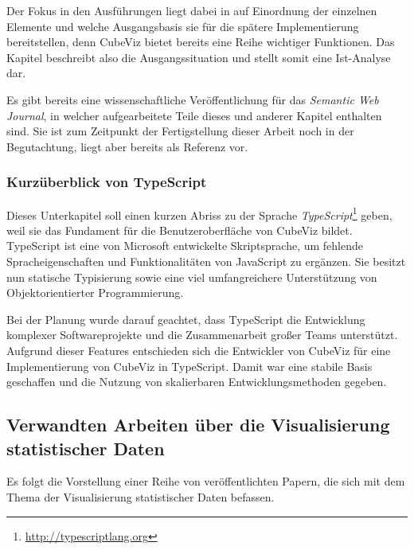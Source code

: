 \documentclass[11pt]{article}
\begin{document}
\noindent
Der Fokus in den Ausführungen liegt dabei in auf Einordnung der einzelnen Elemente und welche Ausgangsbasis sie für die spätere Implementierung bereitstellen, denn CubeViz bietet bereits eine Reihe wichtiger Funktionen. Das Kapitel beschreibt also die Ausgangssituation und stellt somit eine Ist-Analyse dar.

\noindent
Es gibt bereits eine wissenschaftliche Veröffentlichung für das \textit{Semantic Web Journal}, in welcher aufgearbeitete Teile dieses und anderer Kapitel enthalten sind. Sie ist zum Zeitpunkt der Fertigstellung dieser Arbeit noch in der Begutachtung, liegt aber bereits als Referenz \cite{CUBEVIZ-FUTUREPAPER} vor.


%
%
\subsubsection{Kurzüberblick von TypeScript}
\label{sec:chapterCVTypeScript}

Dieses Unterkapitel soll einen kurzen Abriss zu der Sprache \textit{TypeScript}\footnote{\url{http://typescriptlang.org}} geben, weil sie das Fundament für die Benutzeroberfläche von CubeViz bildet. TypeScript ist eine von Microsoft entwickelte Skriptsprache, um fehlende Spracheigenschaften und Funktionalitäten von JavaScript zu ergänzen. Sie besitzt nun statische Typisierung sowie eine viel umfangreichere Unterstützung von Objektorientierter Programmierung. 

\newpage
\noindent
Bei der Planung wurde darauf geachtet, dass TypeScript die Entwicklung komplexer Softwareprojekte und die Zusammenarbeit großer Teams unterstützt. \cite[S. 1, 8 und 10]{TYPESCRIPT-SPEC} Aufgrund dieser Features entschieden sich die Entwickler von CubeViz für eine Implementierung von CubeViz in TypeScript. Damit war eine stabile Basis geschaffen und die Nutzung von skalierbaren Entwicklungsmethoden gegeben.



%
%
\subsection{Verwandten Arbeiten über die Visualisierung statistischer Daten}
\label{sec:chapterCVRelatedPaper}

Es folgt die Vorstellung einer Reihe von veröffentlichten Papern, die sich mit dem Thema der Visualisierung statistischer Daten befassen.
\end{document}
